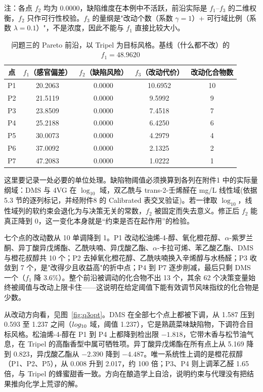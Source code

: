 \begin{table}[htbp]
\centering
\footnotesize
\caption{问题三的 Pareto 前沿，以 Tripel 为目标风格。基线（什么都不改）的 $f_1=48.9620$}
\label{tab:q3}
\begin{minipage}{\textwidth}\footnotesize
注：各点 $f_2$ 均为 0.0000，缺陷维度在本例中不活跃，前沿实际是 $f_1$--$f_3$ 的二维权衡，$f_2$ 只作可行性校验。$f_3$ 的量纲是"改动个数（系数 $\gamma=1$）+ 可行域比例（系数 $\lambda=0.1$）"，不是浓度，因此不能与 $f_1$ 直接比较大小。
\end{minipage}
\begin{tabular*}{\textwidth}{@{\extracolsep{\fill}}ccccc@{}}
\toprule
\textbf{点} & $f_1$（感官偏差） & $f_2$（缺陷风险） & $f_3$（改动代价） & \textbf{改动化合物数} \\
\midrule
P1 & 20.2063 & 0.0000 & 10.6952 & 10 \\
P2 & 21.5119 & 0.0000 & 9.5992 & 9 \\
P3 & 23.8509 & 0.0000 & 7.4518 & 7 \\
P4 & 25.2188 & 0.0000 & 6.4250 & 6 \\
P5 & 30.0073 & 0.0000 & 4.2979 & 4 \\
P6 & 37.0092 & 0.0000 & 2.1325 & 2 \\
P7 & 47.2083 & 0.0000 & 1.0222 & 1 \\
\bottomrule
\end{tabular*}
\end{table}

这里要记录一处必要的单位处理。缺陷物阈值必须换算到各列在附件1 中的实际量纲域：DMS 与 4VG 在 $\log_{10}$ 域，双乙酰与 trans-2-壬烯醛在 mg/L 线性域(依据 5.3 节的逐列标记，并经附件8 的 Calibrated 表交叉验证)。若一律取 $\log_{10}$，线性域列的软约束会退化为与决策无关的常数，$f_2$ 被固定而失去意义。修正后 $f_2$ 能真正降到 0，这一变化本身就是“约束是否在起作用”的检验。

七个点的改动数从 10 单调降到 1。P1 改动松油烯-4-醇、氧化橙花醇、$\alpha$-紫罗兰酮、异丁酸异戊烯酯、乙酰呋喃、异戊酸乙酯、$\alpha$-卡拉可烯、苯乙酸乙酯、DMS 与橙花叔醇共 10 个；P2 去掉氧化橙花醇、乙酰呋喃换入辛烯醇与水杨醛；P3 收敛到 7 个，是"改得少且收益高"的折中点；P4 到 P7 逐步削减，最后只剩 DMS 一个（$f_1$ 降 3.6\%）。整个前沿被调动的化合物不出 13 个，其余 62 个决策变量始终被阈值与改动上限卡住——这说明在给定阈值下能有效调节风味指纹的化合物是少数。

从改动方向看，见图~\ref{fig:q3opt}。DMS 在全部七个点上都被下调，从 1.587 压到 0.593 至 1.237 之间（$\\log_{10}$ 域，阈值 1.237），它是熟蔬菜味缺陷物，下调符合目标风格。松油烯-4-醇在 P1 到 P4 上都降到检出限 $-1.818$，它带木香与松节油气息，在 Tripel 的高酯香型中属可牺牲项。异丁酸异戊烯酯在所有点上从 5.169 降到 0.823，异戊酸乙酯从 $-2.390$ 降到 $-4.487$。唯一系统性上调的是橙花叔醇（P1、P2、P5），从 0.008 升到 2.017，约 100 倍；P3、P4 则上调苯乙醛 1.65 倍，与 Tripel 的蜂蜜甜香一致。方向在酿造学上自洽，说明约束与代理没有把结果推向化学上荒谬的解。

